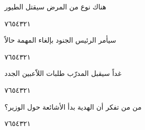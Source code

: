 \documentclass[11pt, a4paper]{article}
\begin{document}
{\vspace{0.5\baselineskip}\begin{flushright}
\textarabic{هناك نوع من المرض سيقتل الطيور}
\end{flushright}

\begin{center}
        \hfill\textarabic{٧}\hfill\textarabic{٦}\hfill\textarabic{٥}\hfill\textarabic{٤}\hfill\textarabic{٣}\hfill\textarabic{٢}\hfill\textarabic{١}
        \end{center}


\vspace{0.5\baselineskip}\begin{flushright}
\textarabic{سيأمر الرئيس الجنود بإلغاء المهمة حالاً}
\end{flushright}

\begin{center}
        \hfill\textarabic{٧}\hfill\textarabic{٦}\hfill\textarabic{٥}\hfill\textarabic{٤}\hfill\textarabic{٣}\hfill\textarabic{٢}\hfill\textarabic{١}
        \end{center}


\vspace{0.5\baselineskip}\begin{flushright}
\textarabic{غداً سيقبل المدرّب طلبات اللاّعبين الجدد}
\end{flushright}

\begin{center}
        \hfill\textarabic{٧}\hfill\textarabic{٦}\hfill\textarabic{٥}\hfill\textarabic{٤}\hfill\textarabic{٣}\hfill\textarabic{٢}\hfill\textarabic{١}
        \end{center}


\vspace{0.5\baselineskip}\begin{flushright}
\textarabic{من من تفكر أن الهدية بدأ الأشائعة حول الوزير؟}
\end{flushright}

\begin{center}
        \hfill\textarabic{٧}\hfill\textarabic{٦}\hfill\textarabic{٥}\hfill\textarabic{٤}\hfill\textarabic{٣}\hfill\textarabic{٢}\hfill\textarabic{١}
        \end{center}


\vspace{0.5\baselineskip}}



\vfill
\end{document}
